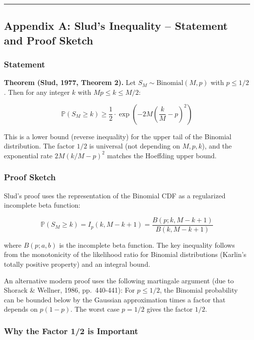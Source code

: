 \documentclass[
  12pt,
]{ctexart}
\begin{document}
\begin{center}\rule{0.5\linewidth}{0.5pt}\end{center}

\subsection{Appendix A: Slud's Inequality -- Statement and Proof
Sketch}\label{appendix-a-sluds-inequality-statement-and-proof-sketch}

\subsubsection{Statement}\label{statement}

\textbf{Theorem (Slud, 1977, Theorem 2).} Let
\(S_M \sim \text{Binomial}(M, p)\) with \(p \leq 1/2\). Then for any
integer \(k\) with \(Mp \leq k \leq M/2\):

\[\mathbb{P}(S_M \geq k) \geq \frac{1}{2} \cdot \exp\!\left(-2M\left(\frac{k}{M} - p\right)^2\right)\]

This is a lower bound (reverse inequality) for the upper tail of the
Binomial distribution. The factor \(1/2\) is universal (not depending on
\(M, p, k\)), and the exponential rate \(2M(k/M - p)^2\) matches the
Hoeffding upper bound.

\subsubsection{Proof Sketch}\label{proof-sketch}

Slud's proof uses the representation of the Binomial CDF as a
regularized incomplete beta function:

\[\mathbb{P}(S_M \geq k) = I_p(k, M-k+1) = \frac{B(p; k, M-k+1)}{B(k, M-k+1)}\]

where \(B(p; a, b)\) is the incomplete beta function. The key inequality
follows from the monotonicity of the likelihood ratio for Binomial
distributions (Karlin's totally positive property) and an integral
bound.

An alternative modern proof uses the following martingale argument (due
to Shorack \& Wellner, 1986, pp.~440-441): For \(p \leq 1/2\), the
Binomial probability can be bounded below by the Gaussian approximation
times a factor that depends on \(p(1-p)\). The worst case \(p = 1/2\)
gives the factor \(1/2\).

\subsubsection{Why the Factor 1/2 is
Important}\label{why-the-factor-12-is-important}
\end{document}
